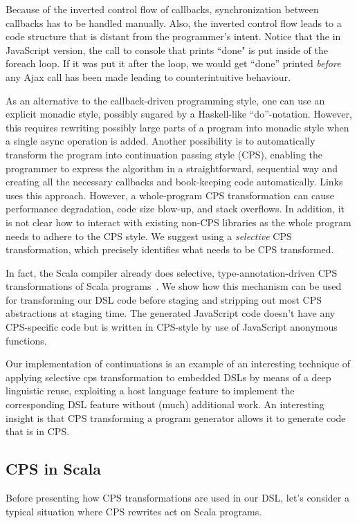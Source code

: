 \documentclass[runningheads,a4paper]{llncs}
\begin{document}
\lstset{basicstyle=\ttfamily}

Because of the inverted control flow of callbacks, synchronization between callbacks has to be handled manually. Also, the inverted control flow leads to a code structure that is distant from the programmer's intent. Notice that the in JavaScript version, the call to console that prints ``done" is put inside of the foreach loop. If it was put it after the loop, we would get ``done'' printed \emph{before} any Ajax call has been made leading to counterintuitive behaviour.

As an alternative to the callback-driven programming style, one can use an explicit monadic style, possibly sugared by a Haskell-like ``do''-notation. However, this requires rewriting possibly large parts of a program into monadic style when a single async operation is added. Another possibility is to automatically transform the program into continuation passing style (CPS), enabling the programmer to express the algorithm in a straightforward, sequential way and creating all the necessary callbacks and book-keeping code automatically. Links~\cite{links} uses this approach. However, a whole-program CPS transformation can cause performance degradation, code size blow-up, and stack overflows. In addition, it is not clear how to interact with existing non-CPS libraries as the whole program needs to adhere to the CPS style. We suggest using a {\it selective} CPS transformation, which precisely identifies what needs to be CPS transformed.

In fact, the Scala compiler already does selective,  type-annotation-driven CPS transformations of Scala programs~\cite{cps-scala,danvy90,danvy92}. We show how this mechanism can be used for transforming our DSL code before staging and stripping out most CPS abstractions at staging time. The generated JavaScript code doesn't have any CPS-specific code but is written in CPS-style by use of JavaScript anonymous functions.

Our implementation of continuations is an example of an interesting technique of applying selective cps
transformation to embedded DSLs by means of a deep linguistic reuse, exploiting a host language feature to
implement the corresponding DSL feature without (much) additional work. An interesting insight is that CPS
transforming a program generator allows it to generate code that is in CPS.

\subsection{CPS in Scala}
Before presenting how CPS transformations are used in our DSL, let's consider a typical situation where CPS rewrites act on Scala programs.
\end{document}
